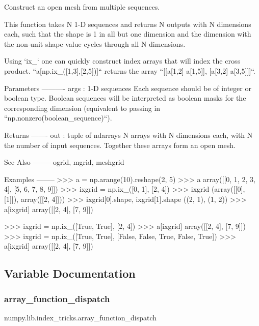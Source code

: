\begin{DoxyVerb}Construct an open mesh from multiple sequences.

This function takes N 1-D sequences and returns N outputs with N
dimensions each, such that the shape is 1 in all but one dimension
and the dimension with the non-unit shape value cycles through all
N dimensions.

Using `ix_` one can quickly construct index arrays that will index
the cross product. ``a[np.ix_([1,3],[2,5])]`` returns the array
``[[a[1,2] a[1,5]], [a[3,2] a[3,5]]]``.

Parameters
----------
args : 1-D sequences
    Each sequence should be of integer or boolean type.
    Boolean sequences will be interpreted as boolean masks for the
    corresponding dimension (equivalent to passing in
    ``np.nonzero(boolean_sequence)``).

Returns
-------
out : tuple of ndarrays
    N arrays with N dimensions each, with N the number of input
    sequences. Together these arrays form an open mesh.

See Also
--------
ogrid, mgrid, meshgrid

Examples
--------
>>> a = np.arange(10).reshape(2, 5)
>>> a
array([[0, 1, 2, 3, 4],
       [5, 6, 7, 8, 9]])
>>> ixgrid = np.ix_([0, 1], [2, 4])
>>> ixgrid
(array([[0],
       [1]]), array([[2, 4]]))
>>> ixgrid[0].shape, ixgrid[1].shape
((2, 1), (1, 2))
>>> a[ixgrid]
array([[2, 4],
       [7, 9]])

>>> ixgrid = np.ix_([True, True], [2, 4])
>>> a[ixgrid]
array([[2, 4],
       [7, 9]])
>>> ixgrid = np.ix_([True, True], [False, False, True, False, True])
>>> a[ixgrid]
array([[2, 4],
       [7, 9]])\end{DoxyVerb}
 

\subsection{Variable Documentation}
\mbox{\label{namespacenumpy_1_1lib_1_1index__tricks_a6186cb7e25fd7c8b6fdcafefb41c7a38}} 
\subsubsection{\texorpdfstring{array\+\_\+function\+\_\+dispatch}{array\_function\_dispatch}}
{\footnotesize\ttfamily numpy.\+lib.\+index\+\_\+tricks.\+array\+\_\+function\+\_\+dispatch}

